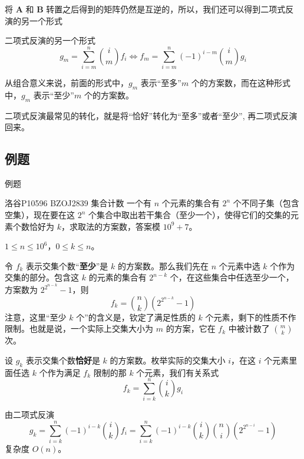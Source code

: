 \documentclass[UTF8]{beamer}
\begin{document}
    \begin{frame}
        将 $\boldsymbol A$ 和 $\boldsymbol B$ 转置之后得到的矩阵仍然是互逆的，所以，我们还可以得到二项式反演的另一个形式

        \begin{block}{二项式反演的另一个形式}
            $$
            g_m = \sum_{i=m}^n\binom{i}{m}f_i\iff f_m=\sum_{i=m}^n(-1)^{i-m}\binom{i}{m}g_i
            $$
        \end{block}

        从组合意义来说，前面的形式中，$g_m$ 表示“至多”$m$ 个的方案数，而在这种形式中，$g_m$ 表示“至少”$m$ 个的方案数。

        二项式反演最常见的转化，就是将“恰好”转化为“至多”或者“至少”, 再二项式反演回来。
    \end{frame}
    \subsection{例题}
    \begin{frame}{例题}
        \begin{block}{洛谷P10596 BZOJ2839 集合计数}
        一个有 $n$ 个元素的集合有 $2^n$ 个不同子集（包含空集），现在要在这 $2^n$ 个集合中取出若干集合（至少一个），使得它们的交集的元素个数恰好为 $k$，求取法的方案数，答案模 $10^9+7$。

        $1\leq n\leq 10^6$，$0\leq k\leq n$。
        \end{block}

        \pause

        令 $f_k$ 表示交集个数“\textbf{至少}”是 $k$ 的方案数。那么我们先在 $n$ 个元素中选 $k$ 个作为交集的部分。包含这 $k$ 的元素的集合有 $2^{n-k}$ 个，在这些集合中任选至少一个，方案数为 $2^{2^{n-k}}-1$，则
        $$
        f_k=\binom{n}{k}(2^{2^{n-k}}-1)
        $$
        注意，这里“至少 $k$ 个”的含义是，钦定了满足性质的 $k$ 个元素，剩下的性质不作限制。也就是说，一个实际上交集大小为 $m$ 的方案，它在 $f_k$ 中被计数了 $\binom{m}{k}$ 次。
    \end{frame}
    \begin{frame}
        设 $g_k$ 表示交集个数\textbf{恰好}是 $k$ 的方案数。枚举实际的交集大小 $i$，在这 $i$ 个元素里面任选 $k$ 个作为满足 $f_k$ 限制的那 $k$ 个元素，我们有关系式
        $$
        f_k=\sum_{i=k}^n\binom{i}{k}g_i
        $$
        \pause

        由二项式反演
        $$
        g_k = \sum_{i=k}^n(-1)^{i-k}\binom{i}{k}f_i=\sum_{i=k}^n(-1)^{i-k}\binom{i}{k}\binom{n}{i}(2^{2^{n-i}}-1)
        $$
        复杂度 $O(n)$。
    \end{frame}
\end{document}
